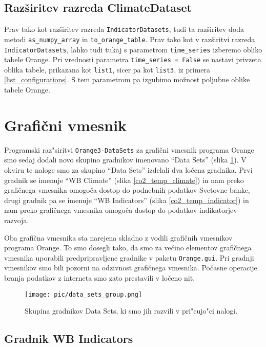 \subsection{Razširitev razreda ClimateDataset}
\label{razsiritev_razreda_climatedataset}

Prav tako kot razširitev razreda \verb|IndicatorDatasets|, tudi ta razširitev
doda metodi \verb|as_numpy_array| in \verb|to_orange_table|. Prav tako kot v
razširitvi razreda \verb|IndicatorDatasets|, lahko tudi tukaj s parametrom
\verb|time_series| izberemo obliko tabele Orange. Pri vrednosti parametra 
\verb|time_series = False| se nastavi privzeta oblika tabele, prikazana kot
\verb|list1|, sicer pa kot \verb|list3|, iz primera \ref{list_configurations}.
S tem parametrom pa izgubimo možnost poljubne oblike tabele Orange.


\section{Grafični vmesnik}

Programski raz"siritvi \verb|Orange3-DataSets| za 
grafični vmesnik programa Orange smo sedaj dodali novo skupino gradnikov imenovano
``Data Sets'' (slika \ref{data_sets_group}). V okviru te naloge smo za skupino
``Data Sets'' izdelali dva ločena gradnika. Prvi gradnik se imenuje ``WB
Climate'' (slika \ref{co2_temp_climate}) in nam preko grafičnega vmesnika 
omogoča dostop do podnebnih podatkov Svetovne banke, drugi gradnik pa se 
imenuje ``WB Indicators'' (slika \ref{co2_temp_indicator}) in nam
preko grafičnega vmesnika omogoča dostop do podatkov indikatorjev razvoja.

Oba grafična vmesnika sta narejena skladno z vodili grafičnih vmesnikov
programa Orange. To smo dosegli tako, da smo za večino elementov grafičnega
vmesnika uporabili predpripravljene gradnike v paketu \verb|Orange.gui|. Pri
gradnji vmesnikov smo bili pozorni na odzivnost grafičnega vmesnika.
Počasne operacije branja podatkov z interneta smo zato prestavili v ločeno nit.
 
\begin{figure}
  \begin{center}
    \texttt{[image: pic/data\_sets\_group.png]}
  \end{center}
  \caption{Skupina gradnikov Data Sets, ki smo jih razvili v pri"cujo"ci nalogi.}
  \label{data_sets_group}
\end{figure} 


\subsection{Gradnik WB Indicators}

